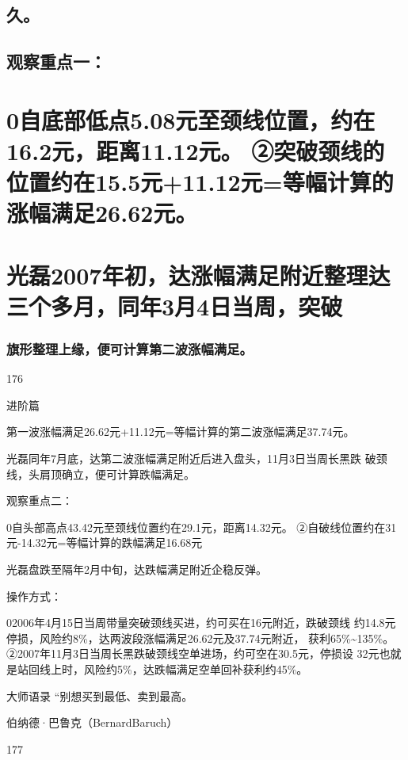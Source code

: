 \documentclass{article}
\begin{document}
\subsection{久。}

\subsection{观察重点一：}

\section{0自底部低点5.08元至颈线位置，约在16.2元，距离11.12元。 ②突破颈线的位置约在15.5元+11.12元=等幅计算的涨幅满足26.62元。}

\section{光磊2007年初，达涨幅满足附近整理达三个多月，同年3月4日当周，突破}

\subsubsection{旗形整理上缘，便可计算第二波涨幅满足。}

176

\clearpage

进阶篇

第一波涨幅满足26.62元+11.12元=等幅计算的第二波涨幅满足37.74元。

光磊同年7月底，达第二波涨幅满足附近后进入盘头，11月3日当周长黑跌 破颈线，头肩顶确立，便可计算跌幅满足。

观察重点二：

0自头部高点43.42元至颈线位置约在29.1元，距离14.32元。 ②自破线位置约在31元-14.32元=等幅计算的跌幅满足16.68元

光磊盘跌至隔年2月中旬，达跌幅满足附近企稳反弹。

操作方式：

02006年4月15日当周带量突破颈线买进，约可买在16元附近，跌破颈线 约14.8元停损，风险约8\%，达两波段涨幅满足26.62元及37.74元附近， 获利65\%\textasciitilde{}135\%。 ②2007年11月3日当周长黑跌破颈线空单进场，约可空在30.5元，停损设 32元也就是站回线上时，风险约5\%，达跌幅满足空单回补获利约45\%。

大师语录 “别想买到最低、卖到最高。

伯纳德·巴鲁克（BernardBaruch）

177

\clearpage
\end{document}
